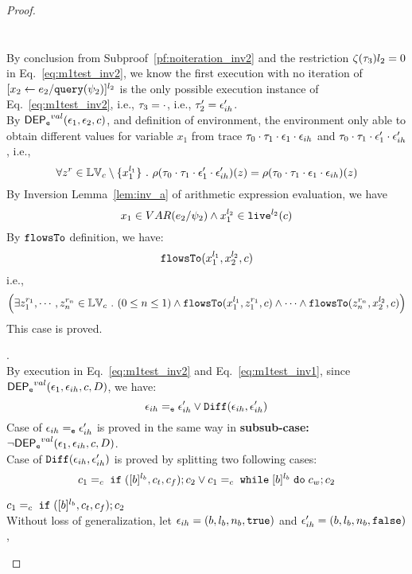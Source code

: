 \begin{proof}
\begin{case}
\begin{subcase}
\begin{subsubcase}
\[\begin{array}{l}
 \end{array} 
\]
%
\\
By conclusion from Subproof~\ref{pf:noiteration_inv2} and the restriction $\mathtt{\zeta}(\mathtt{\tau}_3) l_2 = 0$ in Eq.~\ref{eq:m1test_inv2}, 
we know
the first execution with no iteration of $[\mathrel{ {x}_2 \leftarrow e_2 / {\tt query}(\psi_2) }]^{l_2}$ 
is the only possible execution instance of Eq.~\ref{eq:m1test_inv2}, i.e., $\mathtt{\tau}_3 = \cdot$, i.e., $\mathtt{\tau}_2' = \mathtt{\epsilon}_{ih}'$.
\\
By $\mathsf{DEP_{\mathtt{e}}}^{val}(\mathtt{\epsilon}_1, \mathtt{\epsilon}_2, c)$, and definition of environment, 
the environment only able to obtain different values for variable $x_1$ 
from trace $\mathtt{\tau}_0 \cdot \mathtt{\tau}_1 \cdot \mathtt{\epsilon}_1 \cdot \mathtt{\epsilon}_{ih}$ and 
$\mathtt{\tau}_0 \cdot \mathtt{\tau}_1 \cdot \mathtt{\epsilon}_1' \cdot \mathtt{\epsilon}_{ih}'$, i.e.,
\[
  \forall z^r \in \mathbb{LV}_c \setminus \{x_1^{l_1}\} ~.~
  \rho(\mathtt{\tau}_0 \cdot \mathtt{\tau}_1 \cdot \mathtt{\epsilon}_1' \cdot \mathtt{\epsilon}_{ih}') (z) =  
  \rho(\mathtt{\tau}_0 \cdot \mathtt{\tau}_1 \cdot \mathtt{\epsilon}_1 \cdot \mathtt{\epsilon}_{ih}) (z)
\]
By {Inversion Lemma~\ref{lem:inv_a}} of arithmetic expression evaluation, we have 
\[
  x_1 \in VAR(e_2 / \psi_2) \land x_1^{l_2} \in \mathtt{live}^{l_2}(c)
\]
%
By $\mathtt{flowsTo}$ definition, we have:
%
\[
\mathtt{flowsTo}(x_1^{l_1}, {x}_2^{l_2}, c)
\]
i.e.,
%
\[
\Big(\exists z_1^{r_1}, \cdots, z_n^{r_n} \in \mathbb{LV}_{{c}} ~.~ (0 \leq n \leq 1 )
 \land \mathtt{flowsTo}(x_1^{l_1}, z_1^{r_1}, c) \land \cdots \land \mathtt{flowsTo}(z_n^{r_n}, {x}_2^{l_2}, c) \Big)
\]
%
This case is proved.
\end{subsubcase}
%
\begin{subsubcase}.
\label{case:valdep_ihtestdep}
\\
%
By execution in Eq.~\ref{eq:m1test_inv2} and Eq.~\ref{eq:m1test_inv1}, since $\mathsf{DEP_{\mathtt{e}}}^{val}(\mathtt{\epsilon}_1, \mathtt{\epsilon}_{ih}, c, D)$, we have:
\[
  \mathtt{\epsilon}_{ih} =_{\mathtt{e}} \mathtt{\epsilon}_{ih}' \lor \mathtt{Diff}(\mathtt{\epsilon}_{ih}, \mathtt{\epsilon}_{ih}')
\]
%
Case of $\mathtt{\epsilon}_{ih} =_{\mathtt{e}} \mathtt{\epsilon}_{ih}'$ is proved in the same way in \textbf{subsub-case:} $\neg \mathsf{DEP_{\mathtt{e}}}^{val}(\mathtt{\epsilon}_1, \mathtt{\epsilon}_{ih}, c, D)$.
\\
Case of $\mathtt{Diff}(\mathtt{\epsilon}_{ih}, \mathtt{\epsilon}_{ih}')$ is proved by splitting two following cases:
\[
  c_1 =_c \;\mathtt{if}\; ([b]^{l_b}, c_t, c_f);{c}_2
  \lor
  c_1 =_c \;\mathtt{while}\; [b]^{l_b} \;\mathtt{do}\; c_w;{c}_2
\]
\begin{subproof} 
%
$c_1 =_c \;\mathtt{if}\; ([b]^{l_b}, c_t, c_f);{c}_2$ 
\\
Without loss of generalization, 
let $\mathtt{\epsilon}_{ih} = (b, l_b, n_b, \mathtt{true})$ and
$\mathtt{\epsilon}_{ih}' = (b, l_b, n_b, \mathtt{false})$,

\end{subproof}
\end{subsubcase}
\end{subcase}
\end{case}
\end{proof}

